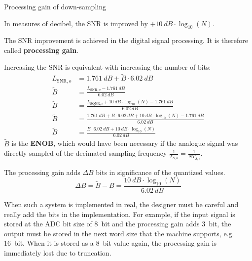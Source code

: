 \begin{refsection}
\begin{definition}{Processing gain of down-sampling}
	\vspace{0.5em}
	
	In measures of decibel, the \ac{SNR} is improved by $+ \SI{10}{dB} \cdot \log_{10} \left(N\right)$.
	
	\vspace{0.5em}
	
	The \ac{SNR} improvement is achieved in the digital signal processing. It is therefore called  \textbf{processing gain}.
\end{definition}

Increasing the \ac{SNR} is equivalent with increasing the number of bits:
\begin{equation}
	\begin{split}
		L_{\mathrm{SNR},o} &= \SI{1.761}{dB} + \tilde{B} \cdot \SI{6.02}{dB} \\
		\tilde{B} &= \frac{L_{\mathrm{SNR},o} - \SI{1.761}{dB}}{\SI{6.02}{dB}} \\
		\tilde{B} &= \frac{L_{\mathrm{SQNR},i} + \SI{10}{dB} \cdot \log_{10} \left(N\right) - \SI{1.761}{dB}}{\SI{6.02}{dB}} \\
		\tilde{B} &= \frac{\SI{1.761}{dB} + B \cdot \SI{6.02}{dB} + \SI{10}{dB} \cdot \log_{10} \left(N\right) - \SI{1.761}{dB}}{\SI{6.02}{dB}} \\
		\tilde{B} &= \frac{B \cdot \SI{6.02}{dB} + \SI{10}{dB} \cdot \log_{10} \left(N\right)}{\SI{6.02}{dB}}
	\end{split}
\end{equation}
$\tilde{B}$ is the  \textbf{\acf{ENOB}}, which would have been necessary if the analogue signal was directly sampled of the decimated sampling frequency $\frac{1}{T_{S,o}} = \frac{1}{N T_{S,i}}$.

The processing gain adds $\Delta B$ bits in significance of the quantized values.
\begin{equation}
	\Delta B = \tilde{B} - B = \frac{\SI{10}{dB} \cdot \log_{10} \left(N\right)}{\SI{6.02}{dB}}
\end{equation}
\begin{remark}
	When such a system is implemented in real, the designer must be careful and really add the bits in the implementation. For example, if the input signal is stored at the \ac{ADC} bit size of \SI{8}{bit} and the processing gain adds \SI{3}{bit}, the output must be stored in the next word size that the machine supports, e.g. \SI{16}{bit}. When it is stored as a \SI{8}{bit} value again, the processing gain is immediately lost due to truncation.
\end{remark}


\end{refsection}
